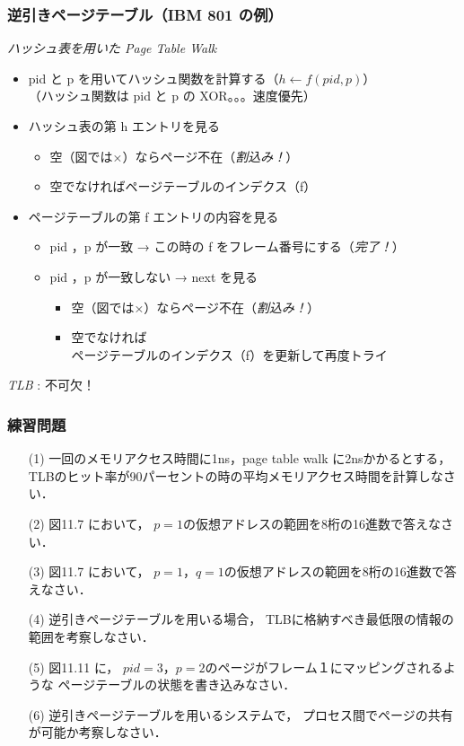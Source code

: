 \documentclass[unicode,handout]{beamer}                   %
\begin{document}
\begin{frame}
  \frametitle{逆引きページテーブル（IBM 801 の例）}
  \emph{ハッシュ表を用いた Page Table Walk}
  \begin{itemize}
  \item pid と p を用いてハッシュ関数を計算する（$h \leftarrow f(pid, p)$）\\
    （ハッシュ関数は pid と p の XOR。。。速度優先）
    \vfill
  \item ハッシュ表の第 h エントリを見る
    \begin{itemize}
      \item 空（図では×）ならページ不在（\emph{割込み！}）
      \item 空でなければページテーブルのインデクス（f）
    \end{itemize}
    \vfill
  \item ページテーブルの第 f エントリの内容を見る
    \begin{itemize}
      \item pid ，p が一致 →  この時の f をフレーム番号にする（\emph{完了！}）
      \item pid ，p が一致しない →  next を見る
        \begin{itemize}
        \item 空（図では×）ならページ不在（\emph{割込み！}）
        \item 空でなければ\\ 
          ページテーブルのインデクス（f）を更新して再度トライ
        \end{itemize}
    \end{itemize}
  \end{itemize}

  \emph{TLB} : 不可欠！
\end{frame}

\begin{frame}
  \frametitle{練習問題}
  \begin{enumerate}
  \item[(1)] 一回のメモリアクセス時間に1ns，page table walk に2nsかかるとする，
    TLBのヒット率が90パーセントの時の平均メモリアクセス時間を計算しなさい．
  \item[(2)] 図11.7 において，
    $p=1$の仮想アドレスの範囲を8桁の16進数で答えなさい．
  \item[(3)] 図11.7 において，
    $p=1$，$q=1$の仮想アドレスの範囲を8桁の16進数で答えなさい．
  \item[(4)] 逆引きページテーブルを用いる場合，
    TLBに格納すべき最低限の情報の範囲を考察しなさい．
  \item[(5)] 図11.11 に，
    $pid=3$，$p=2$のページがフレーム１にマッピングされるような
    ページテーブルの状態を書き込みなさい．
  \item[(6)] 逆引きページテーブルを用いるシステムで，
    プロセス間でページの共有が可能か考察しなさい．
  \end{enumerate}
\end{frame}
\end{document}
